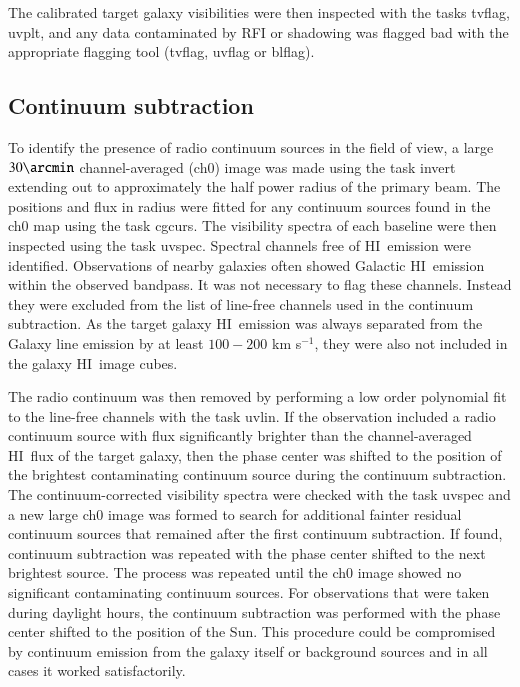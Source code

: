 \documentclass[traditabstract]{aa} %
\newcommand\HI{H{\small I}}
\newcommand\kms{km s$^{-1}$}
\begin{document}
\begin{appendix}
The calibrated target galaxy visibilities were then inspected with the
tasks {\sc tvflag}, {\sc uvplt}, and any data contaminated by
RFI or shadowing was flagged bad with the appropriate flagging
tool ({\sc tvflag}, {\sc uvflag} or {\sc blflag}).


\subsection{Continuum subtraction}
\label{sec:cont-subtr-HI}

To identify the presence of radio continuum sources in the field
of view, a large $30\arcmin$ channel-averaged (ch0) image was made
using the task {\sc invert} extending out to approximately the half
power radius of the primary beam. The positions and flux in radius
were fitted for any continuum sources found in the ch0 map using
the task {\sc cgcurs}. The visibility spectra of each baseline were
then inspected using the task {\sc uvspec}.  Spectral channels free
of \HI\ emission were identified. Observations of nearby galaxies
often showed Galactic \HI\ emission within the observed bandpass.
It was not necessary to flag these channels.  Instead they were
excluded from the list of line-free channels used in the continuum
subtraction.  As the target galaxy \HI\ emission was always separated
from the Galaxy line emission by at least $100-200$ \kms, they were
also not included in the galaxy \HI\ image cubes.

The radio continuum was then removed by performing a low order
polynomial fit to the line-free channels with the task {\sc uvlin}. If
the observation included a radio continuum source with flux
significantly brighter than the channel-averaged \HI\ flux of the
target galaxy, then the phase center was shifted to the position of
the brightest contaminating continuum source during the continuum
subtraction.  The continuum-corrected visibility spectra were checked
with the task {\sc uvspec} and a new large ch0 image was formed to
search for additional fainter residual continuum sources that remained
after the first continuum subtraction. If found, continuum subtraction
was repeated with the phase center shifted to the next brightest
source.  The process was repeated until the ch0 image showed no
significant contaminating continuum sources. For observations that
were taken during daylight hours, the continuum subtraction was performed 
with the phase center shifted to the position of the Sun. This 
procedure could be compromised by continuum emission
from the galaxy itself or background sources and in all cases it worked 
satisfactorily.


\end{appendix}
\end{document}
